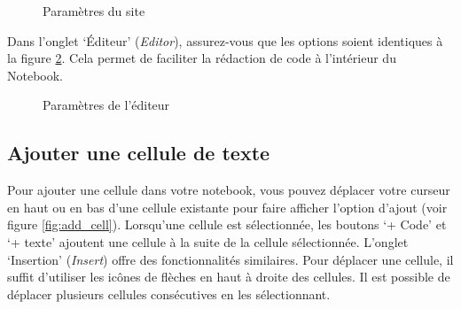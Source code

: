 \documentclass{article}
\begin{document}
\begin{figure}[H]
  \centering
  \caption{Paramètres du site}
  \label{fig:setting_site}
\end{figure}

Dans l'onglet `Éditeur' (\textit{Editor}), assurez-vous que les options soient identiques à la figure \ref{fig:setting_editor}. Cela permet de faciliter la rédaction de code à l'intérieur du Notebook.

\begin{figure}[H]
  \centering
  \caption{Paramètres de l'éditeur}
  \label{fig:setting_editor}
\end{figure}

\subsection{Ajouter une cellule de texte}

Pour ajouter une cellule dans votre notebook, vous pouvez déplacer votre curseur en haut ou en bas d'une cellule existante pour faire afficher l'option d'ajout (voir figure \ref{fig:add_cell}). Lorsqu'une cellule est sélectionnée, les boutons `+ Code' et `+ texte' ajoutent une cellule à la suite de la cellule sélectionnée. L'onglet `Insertion' (\textit{Insert}) offre des fonctionnalités similaires.
\medbreak
Pour déplacer une cellule, il suffit d'utiliser les icônes de flèches en haut à droite des cellules. Il est possible de déplacer plusieurs cellules consécutives en les sélectionnant.
\end{document}

